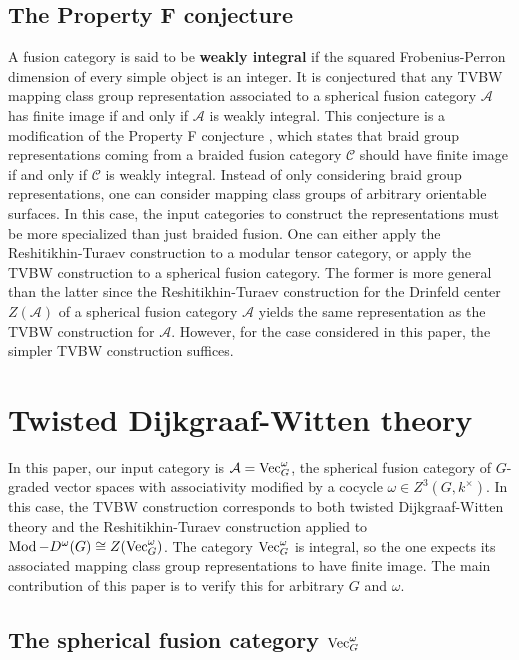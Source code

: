 \subsection{The Property F conjecture}
A fusion category is said to be \textbf{weakly integral} if the squared Frobenius-Perron dimension of every simple object is an integer.  It is conjectured that any TVBW mapping class group representation associated to a spherical fusion category $\mathcal A$ has finite image if and only if  $\mathcal A$ is weakly integral.  This conjecture is a modification of the Property F conjecture \cite{erw, nr}, which states that braid group representations coming from a braided fusion category $\mathcal C$ should have finite image if and only if $\mathcal C$ is weakly integral. Instead of only considering braid group representations, one can consider mapping class groups of arbitrary orientable surfaces.  In this case, the input categories to construct the representations must be more specialized than just braided fusion.  One can either apply the Reshitikhin-Turaev construction to a modular tensor category, or apply the TVBW construction to a spherical fusion category.  The former is more general than the latter since the Reshitikhin-Turaev construction for the Drinfeld center $Z(\mathcal A)$ of a spherical fusion category $\mathcal A$ yields the same representation as the TVBW construction for $\mathcal A$.  However, for the case considered in this paper, the simpler TVBW construction suffices.

\section{Twisted Dijkgraaf-Witten theory}

In this paper, our input category is  $\mathcal A = \operatorname{Vec}_G^\omega$, the spherical fusion category of $G$-graded vector spaces with associativity modified by a cocycle $\omega \in Z^3(G, k^\times)$.  In this case, the TVBW construction corresponds to both twisted Dijkgraaf-Witten theory \cite{dijkgraaf1990} and the Reshitikhin-Turaev construction \cite{reshetikhin1991invariants} applied to $\operatorname{Mod}-D^\omega(G) \cong Z(\operatorname{Vec}_G^\omega)$.  The category $\operatorname{Vec}_G^\omega$ is integral, so the one expects its associated mapping class group representations to have finite image.  The main contribution of this paper is to verify this for arbitrary $G$ and $\omega$.


\subsection{The spherical fusion category $\operatorname{Vec}_G^\omega$}


